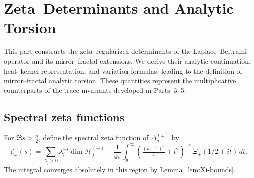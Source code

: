 

\section{Zeta–Determinants and Analytic Torsion}
\label{sec:ch6-part6-zeta-determinant-torsion} \relax \hspace{0pt}

This part constructs the zeta–regularized determinants of the Laplace–Beltrami operator and its mirror–fractal extensions.  
We derive their analytic continuation, heat–kernel representation, and variation formulas, leading to the definition of mirror–fractal analytic torsion.  
These quantities represent the multiplicative counterparts of the trace invariants developed in Parts~3–5. %
\FlowBreaker

\subsection{Spectral zeta functions}
\label{subsec:ch6-part6-spectral-zeta} \relax

\begin{definition}
\label{def:spectral-zeta}
For $\Re s>\frac{n}{2}$, define the spectral zeta function of $\Delta_g^{(\pm)}$ by
\[
\zeta_\pm(s)
=\sum_{\lambda_j>0} \lambda_j^{-s}\dim\mathcal{H}_j^{(\pm)}
+\frac{1}{4\pi}\int_0^\infty (\tfrac{(n-1)^2}{4}+t^2)^{-s}\,\Xi_\pm(1/2+it)\,dt.
\]
The integral converges absolutely in this region by Lemma~\ref{lem:Xi-bounds}. %
\end{definition}

